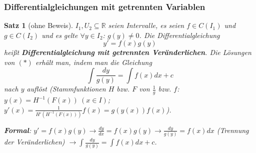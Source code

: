 \documentclass[12pt]{extreport} %
\newcommand{\R}{\mathbb{R}}
\theoremstyle{named}
\theoremstyle{nnamed}
\theoremstyle{itshape}
\newtheorem{satz}[unnamedtheorem]{Satz}
\theoremstyle{normal}
\begin{document}
\subsubsection*{Differentialgleichungen mit getrennten Variablen}

\begin{satz}[ohne Beweis] \label{21.1:satz}
	$I_{1}, U_{2} \subseteq \R$ seien Intervalle, es seien $f \in C(I_{1})$ und $g \in C(I_{2})$ und es gelte $\forall y \in I_{2}$: $g(y) \neq 0$. Die Differentialgleichung
	\begin{equation*}
		y' = f(x) g(y) \tag*{$(*)$}
	\end{equation*}
	hei{\ss}t \textbf{Differentialgleichung mit getrennten Veränderlichen}. Die Lösungen von $(*)$ erhält man, indem man die Gleichung
	$$ \int \frac{dy}{g(y)} = \int f(x) dx + c $$
	nach $y$ auflöst (Stammfunktionen $H$ bzw. $F$ von $\frac{1}{g}$ bzw. $f$: $y(x) = H^{-1}(F(x)) ~(x \in I)$; $y'(x) = \frac{1}{H'(H^{-1}(F(x)))} f(x) = g(y(x)) f(x)$).
	
	\bigskip
	
	\textbf{Formal}: $y' = f(x) g(y) \longrightarrow \frac{dy}{dx} = f(x) g(y) \longrightarrow \frac{dy}{g(y)} = f(x) dx$ (Trennung der Veränderlichen) $\longrightarrow \int \frac{dy}{g(y)} = \int f(x) dx + c$.
\end{satz}
\end{document}
